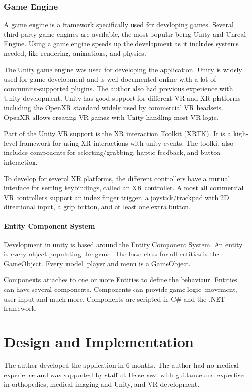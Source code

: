 \documentclass[a4paper]{report}
\begin{document}
\subsection{Game Engine}
A game engine is a framework specifically used for developing games\cite{gameengine}. Several third party game engines are available, the most popular being Unity and Unreal Engine.
Using a game engine speeds up the development as it includes systems needed, like rendering, animations, and physics.

The Unity game engine\cite{technologies_unity_nodate} was used for developing the application. Unity is widely used for game development\cite{doucet_game_2021} and is well documented online with a lot of community-supported plugins. The author also had previous experience with Unity development.
Unity has good support for different VR and XR platforms\cite{technologies_unity_nodate-3} including the OpenXR standard widely used by commercial VR headsets\cite{noauthor_openxr_2016}. OpenXR allows creating VR games with Unity handling most VR logic.

Part of the Unity VR support is the XR interaction Toolkit (XRTK)\cite{noauthor_xr_nodate}. It is a high-level framework for using XR interactions with unity events. The toolkit also includes components for selecting/grabbing, haptic feedback, and button interaction.

To develop for several XR platforms, the different controllers have a mutual interface for setting keybindings, called an XR controller. Almost all commercial VR controllers support an index finger trigger, a joystick/trackpad with 2D directional input, a grip button, and at least one extra button\cite{technologies_unity_nodate}.

\subsubsection{Entity Component System}
Development in unity is based around the Entity Component System\cite{entitycomponent}. An entity is every object populating the game. The base class for all entities is the GameObject. Every model, player and menu is a GameObject.

Components attaches to one or more Entities to define the behaviour. Entities can have several components. Components can provide game logic, movement, user input and much more. Components are scripted in C# and the .NET framework.

\chapter{Design and Implementation}\label{Design and Implementation}
The author developed the application in 6 months. The author had no medical experience and was supported by staff at Helse vest with guidance and expertise in orthopedics, medical imaging and Unity, and VR development.
\end{document}
